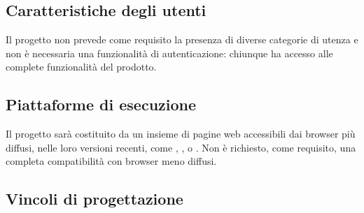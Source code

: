 \subsection{Caratteristiche degli utenti}
Il progetto non prevede come requisito la presenza di diverse categorie di utenza e non è necessaria una funzionalità di autenticazione: chiunque ha accesso alle complete funzionalità del prodotto. 
\subsection{Piattaforme di esecuzione}
Il progetto sarà costituito da un insieme di pagine web accessibili dai browser più diffusi, nelle loro versioni recenti, come , ,  o . Non è richiesto, come requisito, una completa compatibilità con browser meno diffusi.

\newpage

\subsection{Vincoli di progettazione}

